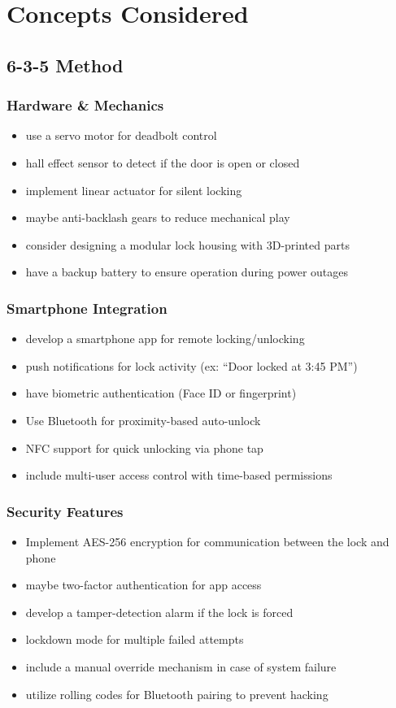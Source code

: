 \section{Concepts Considered}

\subsection{6-3-5 Method}
\subsubsection*{Hardware \& Mechanics}
\begin{itemize}
    \item use a servo motor for deadbolt control
    \item hall effect sensor to detect if the door is open or closed
    \item implement linear actuator for silent locking
    \item maybe anti-backlash gears to reduce mechanical play
    \item consider designing a modular lock housing with 3D-printed parts
    \item have a backup battery to ensure operation during power outages
\end{itemize}

\subsubsection*{Smartphone Integration}
\begin{itemize}
    \item develop a smartphone app for remote locking/unlocking
    \item push notifications for lock activity (ex: ``Door locked at 3:45 PM'')
    \item have biometric authentication (Face ID or fingerprint)
    \item Use Bluetooth for proximity-based auto-unlock
    \item NFC support for quick unlocking via phone tap
    \item include multi-user access control with time-based permissions
\end{itemize}

\subsubsection*{Security Features}
\begin{itemize}
    \item Implement AES-256 encryption for communication between the lock and phone
    \item maybe two-factor authentication for app access
    \item develop a tamper-detection alarm if the lock is forced
    \item lockdown mode for multiple failed attempts
    \item include a manual override mechanism in case of system failure
    \item utilize rolling codes for Bluetooth pairing to prevent hacking
\end{itemize}

